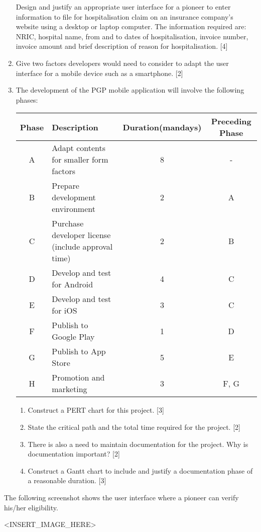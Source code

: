 \begin{enumerate}
Design and justify an appropriate user interface for a pioneer to
enter information to file for hospitalisation claim on an insurance
company's website using a desktop or laptop computer. The information
required are: NRIC, hospital name, from and to dates of hospitalisation,
invoice number, invoice amount and brief description of reason for
hospitalisation. \hfill{}{[}4{]}
\item Give two factors developers would need to consider to adapt the user
interface for a mobile device such as a smartphone. \hfill{}{[}2{]}
\item The development of the PGP mobile application will involve the following
phases: 
\noindent \begin{center}
\begin{tabular}{|c|l|c|c|}
\hline 
Phase & Description & Duration(mandays) & Preceding Phase\tabularnewline
\hline 
\hline 
A & Adapt contents for smaller form factors & 8 & -\tabularnewline
\hline 
B & Prepare development environment & 2 & A\tabularnewline
\hline 
C & Purchase developer license (include approval time)  & 2 & B\tabularnewline
\hline 
D & Develop and test for Android & 4 & C\tabularnewline
\hline 
E & Develop and test for iOS & 3 & C\tabularnewline
\hline 
F & Publish to Google Play & 1 & D\tabularnewline
\hline 
G & Publish to App Store & 5 & E\tabularnewline
\hline 
H & Promotion and marketing & 3 & F, G\tabularnewline
\hline 
\end{tabular}
\par\end{center}
\begin{enumerate}
\item Construct a PERT chart for this project.\hfill{} {[}3{]}
\item State the critical path and the total time required for the project.\hfill{}
{[}2{]}
\item There is also a need to maintain documentation for the project. Why
is documentation important? \hfill{}{[}2{]}
\item Construct a Gantt chart to include and justify a documentation phase
of a reasonable duration.\hfill{} {[}3{]}
\end{enumerate}
\end{enumerate}
The following screenshot shows the user interface where a pioneer
can verify his/her eligibility. 
\noindent \begin{center}
<INSERT\_IMAGE\_HERE>
\par\end{center}
